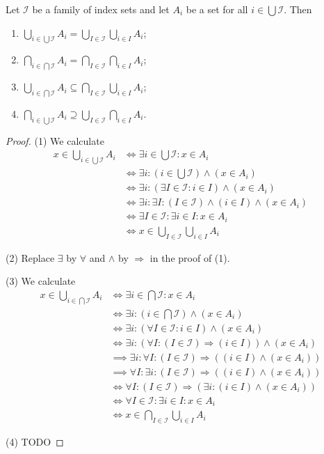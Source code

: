 \begin{lemma} \label{unionIntersectionLabelSet}
Let $\mathcal{I}$ be a family of index sets and let $A_i$ be a set for all $i\in \bigcup \mathcal{I}$. Then
\begin{enumerate}
\item $\bigcup_{i\in \bigcup \mathcal{I}} A_i = \bigcup_{I\in \mathcal{I}}\bigcup_{i\in I} A_i$;
\item $\bigcap_{i\in \bigcap \mathcal{I}} A_i = \bigcap_{I\in \mathcal{I}}\bigcap_{i\in I} A_i$;
\item $\bigcup_{i\in \bigcap \mathcal{I}} A_i \subseteq \bigcap_{I\in \mathcal{I}}\bigcup_{i\in I} A_i$;
\item $\bigcap_{i\in \bigcup \mathcal{I}} A_i \supseteq \bigcup_{I\in \mathcal{I}}\bigcap_{i\in I} A_i$.
\end{enumerate}
\end{lemma}
\begin{proof}
(1) We calculate
\begin{align*}
x\in \bigcup_{i\in \bigcup \mathcal{I}} A_i &\iff \exists i\in \bigcup \mathcal{I}: x\in A_i \\
&\iff \exists i: (i\in \bigcup \mathcal{I}) \land (x\in A_i) \\
&\iff \exists i: (\exists I \in \mathcal{I}: i\in I) \land (x\in A_i) \\
&\iff \exists i: \exists I: (I \in \mathcal{I}) \land (i\in I) \land (x\in A_i) \\
&\iff \exists I\in \mathcal{I}: \exists i \in I: x\in A_i \\
&\iff x\in \bigcup_{I\in \mathcal{I}}\bigcup_{i\in I} A_i
\end{align*}

(2) Replace $\exists$ by $\forall$ and $\land$ by $\Rightarrow$ in the proof of (1).

(3) We calculate
\begin{align*}
x\in \bigcup_{i\in \bigcap \mathcal{I}} A_i &\iff \exists i\in \bigcap \mathcal{I}: x\in A_i \\
&\iff \exists i: (i\in \bigcap \mathcal{I}) \land (x\in A_i) \\
&\iff \exists i: (\forall I \in \mathcal{I}: i\in I) \land (x\in A_i) \\
&\iff \exists i: (\forall I: (I \in \mathcal{I}) \Rightarrow (i\in I)) \land (x\in A_i) \\
&\implies \exists i: \forall I: (I \in \mathcal{I}) \Rightarrow ((i\in I) \land (x\in A_i)) \\
&\implies \forall I: \exists i: (I \in \mathcal{I}) \Rightarrow ((i\in I) \land (x\in A_i)) \\
&\iff \forall I: (I \in \mathcal{I}) \Rightarrow (\exists i:(i\in I) \land (x\in A_i)) \\
&\iff \forall I\in \mathcal{I}: \exists i \in I: x\in A_i \\
&\iff x\in \bigcap_{I\in \mathcal{I}}\bigcup_{i\in I} A_i
\end{align*}

(4) TODO
\end{proof}

